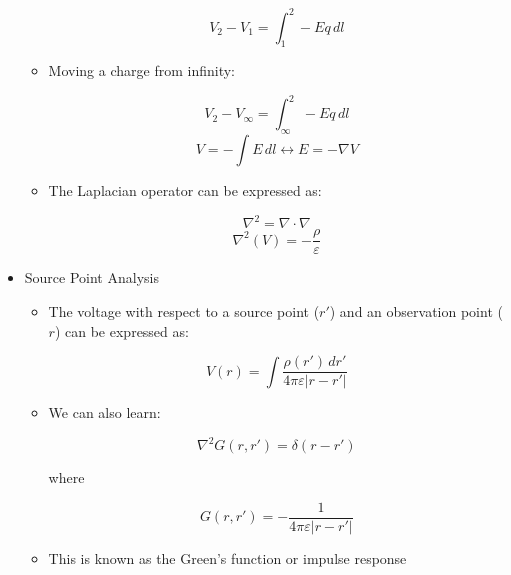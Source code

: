 \begin{itemize}
\begin{itemize}
        $$V_2-V_1=\int_1^2 -Eq\,dl$$

      \item Moving a charge from infinity:

        $$V_2-V_{\infty}=\int_\infty^2 -Eq\,dl$$
        $$V=-\int E\,dl\longleftrightarrow E=-\nabla V$$

      \item The Laplacian operator can be expressed as:

        $$\nabla^2=\nabla\cdot\nabla$$
        $$\nabla^2(V)=-\frac{\rho}{\varepsilon}$$

    \end{itemize}

  \item Source Point Analysis

    \begin{itemize}

      \item The voltage with respect to a source point ($r'$) and an observation point ($r$) can be expressed as:

        $$V(r)=\int\frac{\rho(r')\,dr'}{4\pi\varepsilon|r-r'|}$$

      \item We can also learn:

        $$\nabla^2G(r,r')=\delta(r-r')$$

        where

        $$G(r,r')=-\frac{1}{4\pi\varepsilon|r-r'|}$$

      \item This is known as the Green's function or impulse response

    \end{itemize}

\end{itemize}



